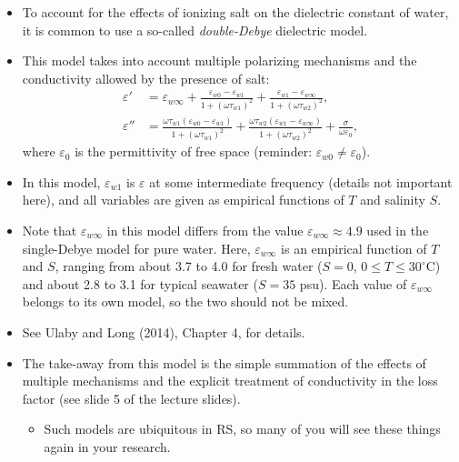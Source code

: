 \documentclass[11pt, oneside]{article}
\begin{document}
\begin{itemize}
	\item To account for the effects of ionizing salt on the dielectric constant of water, it is common to use a so-called \emph{double-Debye} dielectric model.
	\item This model takes into account multiple polarizing mechanisms and the conductivity allowed by the presence of salt:
	\begin{align}
		\varepsilon' &= \varepsilon_{w\infty} + \frac{\varepsilon_{w0} - \varepsilon_{w1}}{1 + (\omega\tau_{w1})^2} + \frac{\varepsilon_{w1} - \varepsilon_{w\infty}}{1 + (\omega\tau_{w2})^2}, \\
		\varepsilon'' &= \frac{\omega\tau_{w1}(\varepsilon_{w0} - \varepsilon_{w1})}{1 + (\omega\tau_{w1})^2} + \frac{\omega\tau_{w2}(\varepsilon_{w1} - \varepsilon_{w\infty})}{1 + (\omega\tau_{w2})^2} + \frac{\sigma}{\omega\varepsilon_0},
	\end{align}
	where $\varepsilon_0$ is the permittivity of free space (reminder: $\varepsilon_{w0} \ne \varepsilon_0$).
	\item In this model, $\varepsilon_{w1}$ is $\varepsilon$ at some intermediate frequency (details not important here), and all variables are given as empirical functions of $T$ and salinity $S$.
	\item Note that $\varepsilon_{w\infty}$ in this model differs from the value $\varepsilon_{w\infty} \approx 4.9$ used in the single-Debye model for pure water. Here, $\varepsilon_{w\infty}$ is an empirical function of $T$ and $S$, ranging from about 3.7 to 4.0 for fresh water ($S = 0$, $0 \le T \le 30^\circ$C) and about 2.8 to 3.1 for typical seawater ($S = 35$ psu). Each value of $\varepsilon_{w\infty}$ belongs to its own model, so the two should not be mixed.
	\item See Ulaby and Long (2014), Chapter 4, for details.
	\item The take-away from this model is the simple summation of the effects of multiple mechanisms and the explicit treatment of conductivity in the loss factor (see slide 5 of the lecture slides).
	\begin{itemize}
		\item Such models are ubiquitous in RS, so many of you will see these things again in your research.
	\end{itemize}
\end{itemize}
\end{document}
